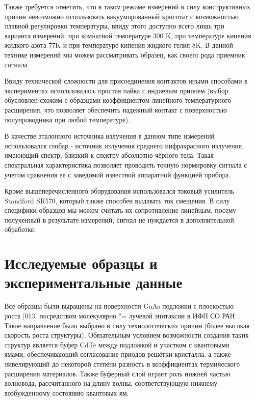 \documentclass[../main.tex]{subfiles}
\begin{document}
    Также требуется отметить, что в таком режиме измерений в силу конструктивных причин невозможно использовать вакуумированный
    крисотат с возможностью плавной регулировки температуры, ввиду этого доступно всего лишь три варианта измерений:
    при комнатной температуре 300 K, при температуре кипения жидкого азота 77K и при температуре кипения жидкого гелия 8K. В
    данной технике измерений мы можем рассматривать образец, как своего рода приемник сигнала. 
    
    Ввиду технической сложности для присоединения контактов иными способами в экспериментах использовалась простая пайка
    с индиевым припоем (выбор обусловлен схожим с образцами коэффициентом линейного температурного расширения, что позволяет 
    обеспечить надежный контакт с поверхностью полупроводника при любой температуре).

    В качестве эталонного источника излучения в данном типе измерений использовался глобар - источник излучения среднего 
    инфракрасного излучения, имеюющий спектр, близкий к спектру абсолютно чёрного тела. Такая спектральная характеристика
    позволяет проводить точную нормировку сигнала с учетом сравнения ее с заведомой известной аппаратной
    функцией прибора.
    
    Кроме вышеперечисленного оборудования использовался токовый усилитель Standford SR570, который также способен выдавать
    ток смещения. В силу специфики образцов мы можем считать их сопротивление линейным, посему полученный
    в результате измерений, сигнал не нуждается в дополнительной обработке.

    \section{Исследуемые образцы и экспериментальные данные}

    Все образцы были выращены на поверхности GaAs подложки с плоскостью роста [013]  посредством молекулярно "= лучевой эпитаксии в ИФП СО РАН \cite{Varavin:2003}.
    Такое направление было выбрано в силу технологических причин (более высокая скорость роста структуры).
    Обязательным условием возможности создания таких структур является буфер CdTe между подложкой 
    и участком с квантовыми ямами, обеспечивающий согласование приодов решётки кристалла, а также нивелирующий
    до некоторой степени разность в коэффициентах термического расширения материалов. Также буферный слой играет 
    роль нижней частью волновода, рассчитанного на длину волны, соответствующую нижнему возбужденному состоянию квантовых ям.
\end{document}
